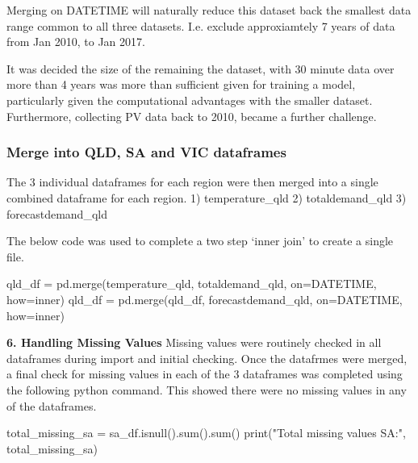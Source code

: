 \documentclass[
]{article}
\newenvironment{Shaded}{}{}
\newcommand{\BuiltInTok}[1]{\textcolor[rgb]{0.00,0.50,0.00}{#1}}
\newcommand{\NormalTok}[1]{#1}
\newcommand{\OperatorTok}[1]{\textcolor[rgb]{0.40,0.40,0.40}{#1}}
\newcommand{\StringTok}[1]{\textcolor[rgb]{0.25,0.44,0.63}{#1}}
\begin{document}
Merging on DATETIME will naturally reduce this dataset back the smallest
data range common to all three datasets. I.e. exclude approxiamtely 7
years of data from Jan 2010, to Jan 2017.

It was decided the size of the remaining the dataset, with 30 minute
data over more than 4 years was more than sufficient given for training
a model, particularly given the computational advantages with the
smaller dataset. Furthermore, collecting PV data back to 2010, became a
further challenge.

\subsubsection{Merge into QLD, SA and VIC
dataframes}\label{merge-into-qld-sa-and-vic-dataframes}

The 3 individual dataframes for each region were then merged into a
single combined dataframe for each region. 1) temperature\_qld 2)
totaldemand\_qld 3) forecastdemand\_qld

The below code was used to complete a two step `inner join' to create a
single file.

\begin{Shaded}
\begin{Highlighting}[]
\NormalTok{qld\_df }\OperatorTok{=}\NormalTok{ pd.merge(temperature\_qld, totaldemand\_qld, on}\OperatorTok{=}\StringTok{\textquotesingle{}DATETIME\textquotesingle{}}\NormalTok{, how}\OperatorTok{=}\StringTok{\textquotesingle{}inner\textquotesingle{}}\NormalTok{)}
\NormalTok{qld\_df }\OperatorTok{=}\NormalTok{ pd.merge(qld\_df, forecastdemand\_qld, on}\OperatorTok{=}\StringTok{\textquotesingle{}DATETIME\textquotesingle{}}\NormalTok{, how}\OperatorTok{=}\StringTok{\textquotesingle{}inner\textquotesingle{}}\NormalTok{)}
\end{Highlighting}
\end{Shaded}

\textbf{6. Handling Missing Values} Missing values were routinely
checked in all dataframes during import and initial checking. Once the
datafrmes were merged, a final check for missing values in each of the 3
dataframes was completed using the following python command. This showed
there were no missing values in any of the dataframes.

\begin{Shaded}
\begin{Highlighting}[]
\NormalTok{total\_missing\_sa }\OperatorTok{=}\NormalTok{ sa\_df.isnull().}\BuiltInTok{sum}\NormalTok{().}\BuiltInTok{sum}\NormalTok{()}
\BuiltInTok{print}\NormalTok{(}\StringTok{"Total missing values SA:"}\NormalTok{, total\_missing\_sa)}
\end{Highlighting}
\end{Shaded}
\end{document}
